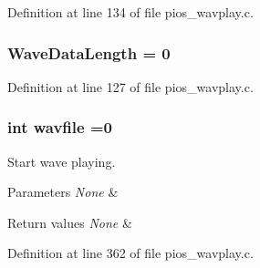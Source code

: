 Definition at line 134 of file pios\-\_\-wavplay.\-c.

\hypertarget{group___w_a_v_e_p_l_a_y_e_r___private___variables_gaed5f7e51bea110d2f608278ffe6c48a3}{
\subsubsection[{Wave\-Data\-Length}]{ Wave\-Data\-Length = 0}}\label{group___w_a_v_e_p_l_a_y_e_r___private___variables_gaed5f7e51bea110d2f608278ffe6c48a3}


Definition at line 127 of file pios\-\_\-wavplay.\-c.

\hypertarget{group___w_a_v_e_p_l_a_y_e_r___private___variables_ga9fe4a9e502dfc977283819847ecc2351}{
\subsubsection[{wavfile}]{\setlength{\rightskip}{0pt plus 5cm}int wavfile =0}}\label{group___w_a_v_e_p_l_a_y_e_r___private___variables_ga9fe4a9e502dfc977283819847ecc2351}


Start wave playing. 


\begin{DoxyParams}{Parameters}
{\em None} & \\
\hline
\end{DoxyParams}

\begin{DoxyRetVals}{Return values}
{\em None} & \\
\hline
\end{DoxyRetVals}


Definition at line 362 of file pios\-\_\-wavplay.\-c.

